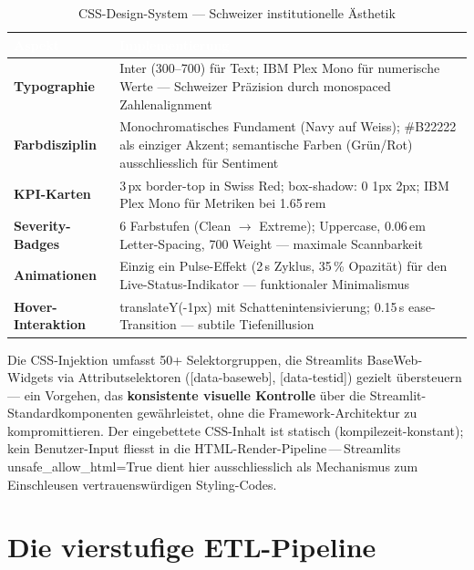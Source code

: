 \documentclass[11pt, a4paper, oneside, openany]{report}
\newcommand{\code}[1]{{\codefont\small\textcolor{DeepNavy}{#1}}}
\begin{document}
\begin{table}[H]
\centering
\caption{CSS-Design-System --- Schweizer institutionelle Ästhetik}
\label{tab:css}
\sffamily\small
\begin{tabularx}{\textwidth}{>{\bfseries}p{3cm} X}
  \toprule
  \rowcolor{DeepNavy} \textcolor{white}{\textbf{Aspekt}} & \textcolor{white}{\textbf{Implementierung}} \\
  \midrule
  Typographie        & Inter (300--700) für Text; IBM Plex Mono für numerische Werte --- Schweizer Präzision durch monospaced Zahlenalignment \\
  Farbdisziplin      & Monochromatisches Fundament (Navy auf Weiss); \code{\#B22222} als einziger Akzent; semantische Farben (Grün/Rot) ausschliesslich für Sentiment \\
  KPI-Karten         & 3\,px \code{border-top} in Swiss Red; \code{box-shadow: 0 1px 2px}; IBM Plex Mono für Metriken bei 1.65\,rem \\
  Severity-Badges    & 6 Farbstufen (Clean $\to$ Extreme); Uppercase, 0.06\,em Letter-Spacing, 700 Weight --- maximale Scannbarkeit \\
  Animationen        & Einzig ein Pulse-Effekt (2\,s Zyklus, 35\,\% Opazität) für den Live-Status-Indikator --- funktionaler Minimalismus \\
  Hover-Interaktion  & \code{translateY(-1px)} mit Schattenintensivierung; 0.15\,s \code{ease}-Transition --- subtile Tiefenillusion \\
  \bottomrule
\end{tabularx}
\end{table}

\begin{insightbox}
Die CSS-Injektion umfasst 50+ Selektorgruppen, die Streamlits BaseWeb-Widgets via Attributselektoren (\code{[data-baseweb]}, \code{[data-testid]}) gezielt übersteuern --- ein Vorgehen, das \textbf{konsistente visuelle Kontrolle} über die Streamlit-Standardkomponenten gewährleistet, ohne die Framework-Architektur zu kompromittieren. Der eingebettete CSS-Inhalt ist statisch (kompilezeit-konstant); kein Benutzer-Input fliesst in die HTML-Render-Pipeline\,---\,Streamlits \code{unsafe\_allow\_html=True} dient hier ausschliesslich als Mechanismus zum Einschleusen vertrauenswürdigen Styling-Codes.
\end{insightbox}

\section{Die vierstufige ETL-Pipeline}
\end{document}
